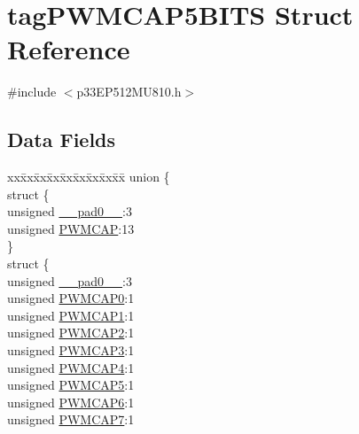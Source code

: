 \hypertarget{structtag_p_w_m_c_a_p5_b_i_t_s}{}\section{tag\+P\+W\+M\+C\+A\+P5\+B\+I\+TS Struct Reference}
\label{structtag_p_w_m_c_a_p5_b_i_t_s}


{\ttfamily \#include $<$p33\+E\+P512\+M\+U810.\+h$>$}

\subsection*{Data Fields}
\begin{DoxyCompactItemize}
\item 
\begin{tabbing}
xx\=xx\=xx\=xx\=xx\=xx\=xx\=xx\=xx\=\kill
union \{\\
\>struct \{\\
\>\>unsigned \hyperlink{structtag_p_w_m_c_a_p5_b_i_t_s_adf71f3d8410c1f1dbbc96680a92c49af}{\_\_pad0\_\_}:3\\
\>\>unsigned \hyperlink{structtag_p_w_m_c_a_p5_b_i_t_s_a3877a5299772d03214ef452994c53979}{PWMCAP}:13\\
\>\} \\
\>struct \{\\
\>\>unsigned \hyperlink{structtag_p_w_m_c_a_p5_b_i_t_s_adf71f3d8410c1f1dbbc96680a92c49af}{\_\_pad0\_\_}:3\\
\>\>unsigned \hyperlink{structtag_p_w_m_c_a_p5_b_i_t_s_a34c685289d01ac79a9b067b945e411b0}{PWMCAP0}:1\\
\>\>unsigned \hyperlink{structtag_p_w_m_c_a_p5_b_i_t_s_a4c90f0d96eece06b7d6c7e41e394b417}{PWMCAP1}:1\\
\>\>unsigned \hyperlink{structtag_p_w_m_c_a_p5_b_i_t_s_a2111a4368f6512c24cf193f6c83672e3}{PWMCAP2}:1\\
\>\>unsigned \hyperlink{structtag_p_w_m_c_a_p5_b_i_t_s_a5d3e7376fc29096ef98492e81f73590d}{PWMCAP3}:1\\
\>\>unsigned \hyperlink{structtag_p_w_m_c_a_p5_b_i_t_s_a07f7fb680f8c9bdd5d3c94a84a30a7b5}{PWMCAP4}:1\\
\>\>unsigned \hyperlink{structtag_p_w_m_c_a_p5_b_i_t_s_a434b71ab2093a53faf535c8f27973f7b}{PWMCAP5}:1\\
\>\>unsigned \hyperlink{structtag_p_w_m_c_a_p5_b_i_t_s_a4249adbed71df183d967bd51f8d811fa}{PWMCAP6}:1\\
\>\>unsigned \hyperlink{structtag_p_w_m_c_a_p5_b_i_t_s_a282c7ae90ac64b1a78eb1351a7d0eee0}{PWMCAP7}:1\\

\end{tabbing}
\end{DoxyCompactItemize}
